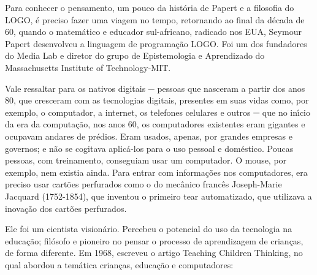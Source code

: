 \documentclass[
12pt,		%
openright,	%
twoside,  %
a4paper,			%
chapter=TITLE,		%
english,			%
french,				%
spanish,			%
brazil				%
]{USPSC-classe/USPSC_RedarTex}
\begin{document}
Para conhecer  o pensamento, um pouco da hist\'oria de Papert e  a filosofia do LOGO, \'e preciso fazer uma viagem no tempo, retornando ao final da d\'ecada de 60, quando o matem\'atico e educador sul-africano, radicado nos EUA, Seymour Papert desenvolveu a linguagem   de programa\c{c}\~ao LOGO.  Foi um dos fundadores do Media Lab e diretor do grupo de Epistemologia e Aprendizado do Massachusetts Institute of Technology-MIT.










Vale ressaltar para os nativos digitais ─ pessoas que nasceram a partir dos anos 80, que cresceram com as tecnologias digitais, presentes em suas vidas como, por exemplo, o computador,  a internet, os telefones celulares e outros ─ que no in\'{\i}cio da era da computa\c{c}\~ao, nos anos 60, os computadores existentes eram gigantes e ocupavam andares de pr\'edios. Eram usados, apenas, por grandes empresas e governos; e n\~ao se cogitava aplic\'a-los para o uso pessoal e dom\'estico. Poucas pessoas, com treinamento, conseguiam usar um computador. O mouse, por exemplo, nem existia ainda. Para entrar com informa\c{c}\~oes nos computadores, era preciso usar cart\~oes perfurados como o do mec\^anico franc\^es Joseph-Marie Jacquard (1752-1854), que inventou o primeiro tear automatizado,  que  utilizava a inova\c{c}\~ao dos cart\~oes perfurados.










Ele foi um cientista vision\'ario. Percebeu o potencial do uso da tecnologia na educa\c{c}\~ao; fil\'osofo e pioneiro no pensar o processo de aprendizagem de crian\c{c}as, de forma diferente. Em 1968, escreveu o artigo \textquotedbl Teaching Children Thinking\textquotedbl , no qual abordou a tem\'atica crian\c{c}as, educa\c{c}\~ao e computadores:











\noindent\begin{center}\mbox{\centering{}}\end{center}
\end{document}
